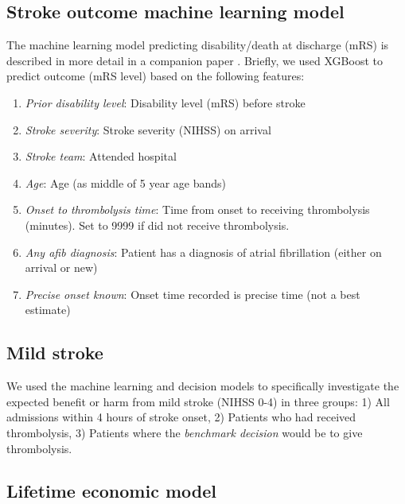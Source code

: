 \subsection{Stroke outcome machine learning model}

The machine learning model predicting disability/death at discharge (mRS) is described in more detail in a companion paper \cite{pearn_are_2024}. Briefly, we used XGBoost \cite{chen_xgboost_2016} to predict outcome (mRS level) based on the following features:

\begin{enumerate}
    \item \textit{Prior disability level}: Disability level (mRS) before stroke
    \item \textit{Stroke severity}: Stroke severity (NIHSS) on arrival
    \item \textit{Stroke team}: Attended hospital
    \item \textit{Age}: Age (as middle of 5 year age bands)
    \item \textit{Onset to thrombolysis time}: Time from onset to receiving thrombolysis (minutes). Set to 9999 if did not receive thrombolysis.
    \item \textit{Any afib diagnosis}: Patient has a diagnosis of atrial fibrillation (either on arrival or new)
    \item \textit{Precise onset known}: Onset time recorded is precise time (not a best estimate)
\end{enumerate}

\subsection{Mild stroke}

We used the machine learning and decision models to specifically investigate the expected benefit or harm from mild stroke (NIHSS 0-4) in three groups: 1) All admissions within 4 hours of stroke onset, 2) Patients who had received thrombolysis, 3) Patients where the \textit{benchmark decision} would be to give thrombolysis.

\subsection{Lifetime economic model}

